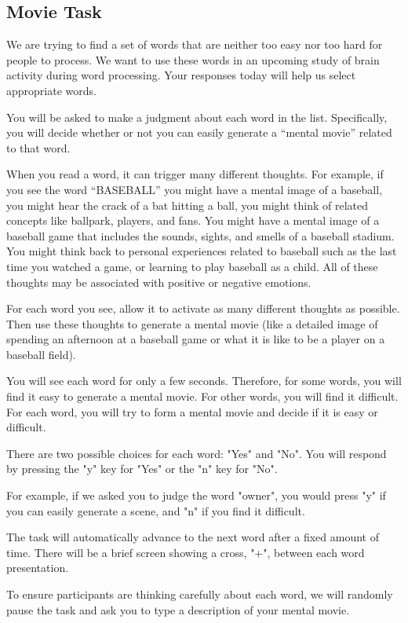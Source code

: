 \documentclass[man,natbib,floatsintext]{apa6} %
\begin{document}
\subsection{Movie Task}
\begin{displayquote}
We are trying to find a set of words that are neither too easy nor too hard for people to process. We want to use these words in an upcoming study of brain activity during word processing. Your responses today will help us select appropriate words.

You will be asked to make a judgment about each word in the list. Specifically, you will decide whether or not you can easily generate a ``mental movie'' related to that word.

When you read a word, it can trigger many different thoughts. For example, if you see the word ``BASEBALL'' you might have a mental image of a baseball, you might hear the crack of a bat hitting a ball, you might think of related concepts like ballpark, players, and fans. You might have a mental image of a baseball game that includes the sounds, sights, and smells of a baseball stadium. You might think back to personal experiences related to baseball such as the last time you watched a game, or learning to play baseball as a child. All of these thoughts may be associated with positive or negative emotions.

For each word you see, allow it to activate as many different thoughts as possible. Then use these thoughts to generate a mental movie (like a detailed image of spending an afternoon at a baseball game or what it is like to be a player on a baseball field).

You will see each word for only a few seconds. Therefore, for some words, you will find it easy to generate a mental movie. For other words, you will find it difficult. For each word, you will try to form a mental movie and decide if it is easy or difficult.

There are two possible choices for each word: "Yes" and "No". You will respond by pressing the "y" key for "Yes" or the "n" key for "No".

For example, if we asked you to judge the word "owner", you would press "y" if you can easily generate a scene, and "n" if you find it difficult.

The task will automatically advance to the next word after a fixed amount of time. There will be a brief screen showing a cross, "+", between each word presentation.

To ensure participants are thinking carefully about each word, we will randomly pause the task and ask you to type a description of your mental movie.
\end{displayquote}
\end{document}
